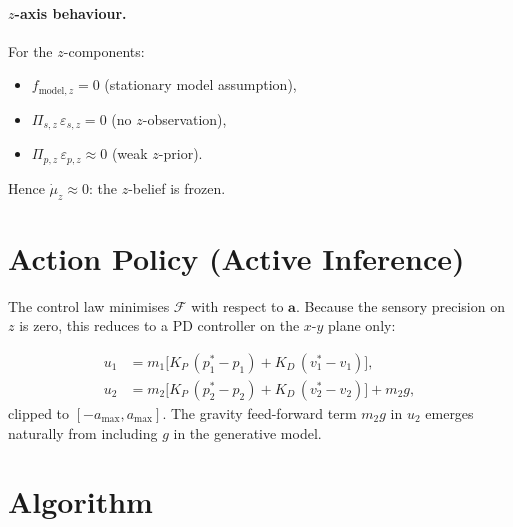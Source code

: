 \documentclass[11pt, a4paper]{article}
\newcommand{\vect}[1]{\bm{#1}}
\newcommand{\FE}{\mathcal{F}}
\begin{document}
\paragraph{$z$-axis behaviour.}
For the $z$-components:
\begin{itemize}[noitemsep]
  \item $f_{\text{model},z} = 0$ (stationary model assumption),
  \item $\Pi_{s,z}\,\varepsilon_{s,z} = 0$ (no $z$-observation),
  \item $\Pi_{p,z}\,\varepsilon_{p,z} \approx 0$ (weak $z$-prior).
\end{itemize}
Hence $\dot{\mu}_z \approx 0$: the $z$-belief is frozen.

\section{Action Policy (Active Inference)}

The control law minimises $\FE$ with respect to $\vect{a}$.
Because the sensory precision on $z$ is zero, this reduces to a PD
controller on the $x$-$y$ plane only:

\begin{align}
  u_1 &= m_1\bigl[K_P\,(p_1^* - p_1) + K_D\,(v_1^* - v_1)\bigr], \\[4pt]
  u_2 &= m_2\bigl[K_P\,(p_2^* - p_2) + K_D\,(v_2^* - v_2)\bigr] + m_2 g,
\end{align}
clipped to $[-a_{\max}, a_{\max}]$. The gravity feed-forward term $m_2 g$ in
$u_2$ emerges naturally from including $g$ in the generative model.

\section{Algorithm}
\end{document}

